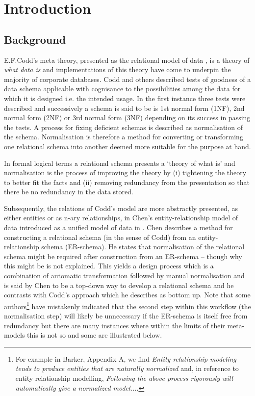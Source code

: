 

\section{Introduction}

\subsection{Background}
E.F.Codd's meta theory, presented as the relational model of data \cite{Codd1970},
 is a theory of \textit{what data is} and implementations of this theory have come to underpin 
the majority of corporate databases.   Codd and others described tests of goodness of a data schema applicable with cognisance to the possibilities among the data for which it is designed i.e. the intended usage.
In the first instance three tests were described and successively a schema is said to be is 1st normal form (1NF), 2nd normal form (2NF) or 3rd normal form (3NF) depending on its success in passing the tests. A process for fixing deficient schemas is described as normalisation of the schema. 
Normalisation is therefore a method for converting or transforming one relational schema into another deemed more suitable for the purpose at hand. 

In formal logical terms a relational schema presents a `theory of what is' and normalisation is the process of improving the theory by (i) tightening the theory to better fit the facts and (ii) removing redundancy from the presentation so that there be no redundancy in the data stored.

Subsequently, the relations of Codd's model are more abstractly presented, as either entities or as n-ary relationships, in Chen's entity-relationship model of data introduced as a unified model of data in \cite{Chen1976}. 
Chen describes a method for constructing 
a relational schema (in the sense of Codd) from an entity-relationship schema (ER-schema).
He states that normalisation of the relational schema might be required after construction from an ER-schema -- though why this might be is not explained. 
This yields a design process which is a combination of automatic transformation followed by manual
normalisation and is said by Chen to be a top-down way to develop a relational schema and  he contrasts with Codd's approach which he describes as bottom up.
Note that some authors\footnote{For example in Barker, Appendix A,  we find \textit{Entity relationship modeling tends to produce entities that are naturally normalized} and, in reference to entity relationship modelling, \textit{Following the above process  rigorously will automatically give a normalized model...}. } have mistakenly indicated that the second step within this workflow 
(the normalisation step) will likely be unnecessary if the ER-schema is itself free from redundancy
but there are many instances where within the limits of their meta-models this is not so and some are illustrated below. 

